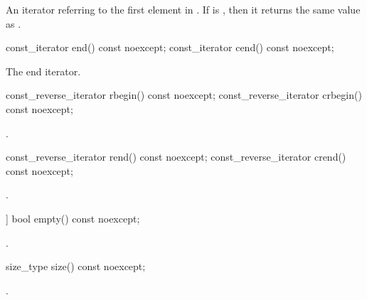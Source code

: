 \begin{itemdescr}
\pnum
\returns
An iterator referring to the first element in .
If  is ,
then it returns the same value as .
\end{itemdescr}

%
%
\begin{itemdecl}
const_iterator end() const noexcept;
const_iterator cend() const noexcept;
\end{itemdecl}

\begin{itemdescr}
\pnum
\returns
The end iterator.
\end{itemdescr}

%
%
\begin{itemdecl}
const_reverse_iterator rbegin() const noexcept;
const_reverse_iterator crbegin() const noexcept;
\end{itemdecl}

\begin{itemdescr}
\pnum
\returns
{}.
\end{itemdescr}

%
%
\begin{itemdecl}
const_reverse_iterator rend() const noexcept;
const_reverse_iterator crend() const noexcept;
\end{itemdecl}

\begin{itemdescr}
\pnum
\returns
{}.
\end{itemdescr}

%
\begin{itemdecl}
[[nodiscard]] bool empty() const noexcept;
\end{itemdecl}

\begin{itemdescr}
\pnum
\returns
{}.
\end{itemdescr}

%
\begin{itemdecl}
size_type size() const noexcept;
\end{itemdecl}

\begin{itemdescr}
\pnum
\returns
{}.
\end{itemdescr}

